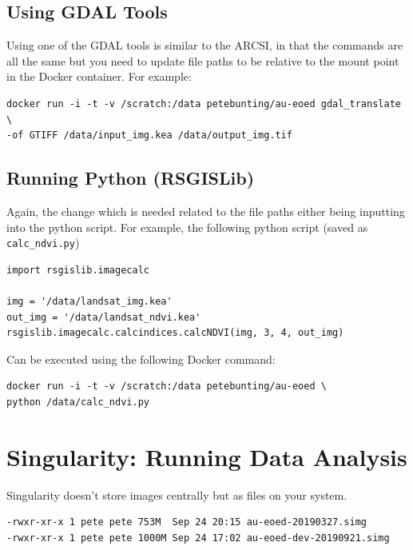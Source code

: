 \documentclass[authoryear, 11pt, oneside]{report}
\begin{document}
\section{Using GDAL Tools}

Using one of the GDAL tools is similar to the ARCSI, in that the commands are all the same but you need to update file paths to be relative to the mount point in the Docker container. For example:

\begin{verbatim}
docker run -i -t -v /scratch:/data petebunting/au-eoed gdal_translate \
-of GTIFF /data/input_img.kea /data/output_img.tif
\end{verbatim}

\section{Running Python (RSGISLib)}

Again, the change which is needed related to the file paths either being inputting into the python script. For example, the following python script (saved as \texttt{calc_ndvi.py})

\begin{verbatim}
import rsgislib.imagecalc

img = '/data/landsat_img.kea'
out_img = '/data/landsat_ndvi.kea'
rsgislib.imagecalc.calcindices.calcNDVI(img, 3, 4, out_img)

\end{verbatim}

Can be executed using the following Docker command:

\begin{verbatim}
docker run -i -t -v /scratch:/data petebunting/au-eoed \
python /data/calc_ndvi.py
\end{verbatim}


\chapter{Singularity: Running Data Analysis}

Singularity doesn't store images centrally but as files on your system. 

\begin{verbatim}
-rwxr-xr-x 1 pete pete 753M  Sep 24 20:15 au-eoed-20190327.simg
-rwxr-xr-x 1 pete pete 1000M Sep 24 17:02 au-eoed-dev-20190921.simg
\end{verbatim}
\end{document}
